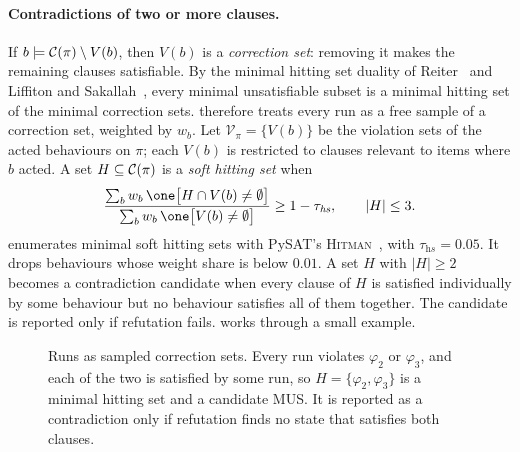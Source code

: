 \paragraph{Contradictions of two or more clauses.} If $b\models\mathcal{C}(\pi)\setminus V(b)$, then $V(b)$ is a \emph{correction set}: removing it makes the remaining clauses satisfiable. By the minimal hitting set duality of Reiter~\cite{reiter1987theory} and Liffiton and Sakallah~\cite{liffiton2008algorithms}, every minimal unsatisfiable subset is a minimal hitting set of the minimal correction sets. \specdx therefore treats every run as a free sample of a correction set, weighted by $w_b$. Let $\mathcal{V}_\pi=\{V(b)\}$ be the violation sets of the acted behaviours on $\pi$; each $V(b)$ is restricted to clauses relevant to items where $b$ acted. A set $H\subseteq\mathcal{C}(\pi)$ is a \emph{soft hitting set} when
\begin{equation}
\label{eq:sofths}
\frac{\sum_{b}w_b\,\one\bigl[H\cap V(b)\neq\emptyset\bigr]}{\sum_b w_b\,\one\bigl[V(b)\neq\emptyset\bigr]}\ge 1-\tau_{\textit{hs}},\qquad |H|\le 3 .
\end{equation}
\specdx enumerates minimal soft hitting sets with PySAT's \textsc{Hitman}~\cite{ignatiev2018pysat}, with $\tau_{\textit{hs}}=0.05$. It drops behaviours whose weight share is below $0.01$. A set $H$ with $|H|\ge 2$ becomes a contradiction candidate when every clause of $H$ is satisfied individually by some behaviour but no behaviour satisfies all of them together. The candidate is reported only if refutation fails.  works through a small example.

\begin{figure}[t]
\centering
\resizebox{\textwidth}{!}{}
\caption{Runs as sampled correction sets. Every run violates $\varphi_2$ or $\varphi_3$, and each of the two is satisfied by some run, so $H=\{\varphi_2,\varphi_3\}$ is a minimal hitting set and a candidate MUS. It is reported as a contradiction only if refutation finds no state that satisfies both clauses.}
\label{fig:hitting}
\end{figure}

